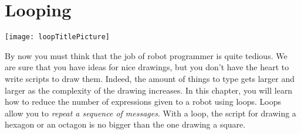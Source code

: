\ifx\wholebook\relax\else



\fi

\chapter{Looping}\label{ch:looping}\label{cha:loops}

\begin{chapterfigure}
\texttt{[image: loopTitlePicture]}
\end{chapterfigure}



By now you must think that the job of robot programmer is quite
tedious. We are sure that you have ideas \newcommand{\replace}[2]{of}{for} nice drawings, but you \newcommand{\replace}[2]{did not}{don't} have the heart to \newcommand{\replace}[2]{draw}{write} scripts to draw them.  Indeed, the amount of things to type gets larger and larger as the complexity of the drawing \newcommand{\replace}[2]{augments}{increases}. \newcommand{\add}[1]{\paragraph
}
In this chapter, you will learn how to reduce the \newcommand{\replace}[2]{amount}{number} of expressions given to a robot \newcommand{\add}[1]{by} using loops. Loops allow you to \emph{repeat a sequence of messages}. With a loop, the script for drawing \newcommand{\replace}[2]{an}{a} hexagon or an octagon is no bigger than the one \newcommand{\add}[1]{for} drawing a square.

